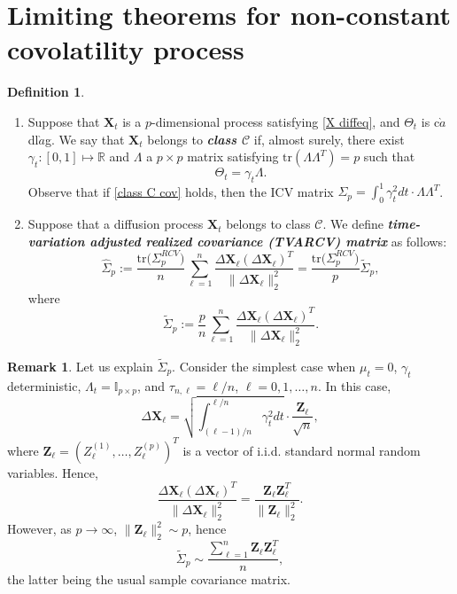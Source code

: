 \documentclass[a4paper,11pt]{article}
\theoremstyle{plain}
\theoremstyle{definition}
\newtheorem{defn}[thm]{Definition}
\newtheorem{rmrk}[thm]{Remark}
\newcommand{\MR}{\mathbb{R}}
\newcommand{\tr}{\mathrm{tr}}
\newcommand{\define}[1]{\textit{\textbf{#1}}}
\begin{document}
    \section{Limiting theorems for non-constant covolatility process}
    
    \begin{defn} \
    	\begin{enumerate}
    		\item Suppose that $\mathbf{X}_t$ is a $p$-dimensional process satisfying \eqref{X diffeq}, and $\Theta_t$ is c$\grave{a}$dl$\grave{a}$g. We say that $\mathbf{X}_t$ belongs to \define{class $\mathcal{C}$} if, almost surely, there exist $\gamma_t: [0, 1] \mapsto \MR$ and $\Lambda$ a $p \times p$ matrix satisfying $\tr(\Lambda \Lambda^T) = p$ such that 
    		\begin{equation} \label{class C cov}
    		\Theta_t = \gamma_t \Lambda.
    		\end{equation}
    		Observe that if \eqref{class C cov} holds, then the ICV matrix $\Sigma_p = \int_{0}^{1} \gamma_t^2 dt \cdot \Lambda \Lambda^T$.
    		\item Suppose that a diffusion process $\mathbf{X}_t$ belongs to class $\mathcal{C}$. We define \define{time-variation adjusted realized covariance (TVARCV) matrix} as follows:
    		\begin{equation} \label{TVARCV}
    		\widehat{\Sigma}_p := \frac{\tr \big( \Sigma_p^{RCV} \big) }{n} \sum_{\ell = 1}^{n} \frac{\Delta \mathbf{X}_\ell (\Delta \mathbf{X}_\ell)^T}{\| \Delta \mathbf{X}_\ell \|_2^2} = \frac{\tr \big( \Sigma_p^{RCV} \big) }{p} \widetilde{\Sigma}_p,
    		\end{equation}
    		where
    		\begin{equation} \label{Sigma_tilde}
    		\widetilde{\Sigma}_p := \frac{p}{n} \sum_{\ell = 1}^{n} \frac{\Delta \mathbf{X}_\ell (\Delta \mathbf{X}_\ell)^T}{\| \Delta \mathbf{X}_\ell \|_2^2}.
    		\end{equation}
    	\end{enumerate}
    \end{defn}
    
    \begin{rmrk}
    	Let us explain $\widetilde{\Sigma}_p$. Consider the simplest case when $\mu_t = 0$, $\gamma_t$ deterministic, $\Lambda_t = \mathbb{I}_{p \times p}$, and $\tau_{n,\ell} = \ell / n$, $\ell = 0, 1, \dots, n$. In this case,
    	\[ \Delta \mathbf{X}_\ell = \sqrt{\int_{(\ell - 1)/n}^{\ell / n} \gamma_t^2 dt }\cdot \frac{\mathbf{Z}_\ell}{\sqrt{n}}, \]
    	where $\mathbf{Z}_\ell = (Z_\ell^{(1)}, \dots, Z_\ell^{(p)})^T$ is a vector of i.i.d. standard normal random variables. Hence,
    	\[ \frac{\Delta \mathbf{X}_\ell (\Delta \mathbf{X}_\ell)^T}{\| \Delta \mathbf{X}_\ell \|_2^2} = \frac{\mathbf{Z}_\ell \mathbf{Z}_\ell^T}{\|  \mathbf{Z}_\ell \|_2^2}. \]
    	However, as $p \rightarrow \infty$, $\| \mathbf{Z}_\ell \|_2^2 \sim p$, hence
    	\[ \widetilde{\Sigma}_p \sim \frac{\sum_{\ell = 1}^{n}\mathbf{Z}_\ell \mathbf{Z}_\ell^T}{n}, \]
    	the latter being the usual sample covariance matrix.
    \end{rmrk}
    
    
\end{document}
